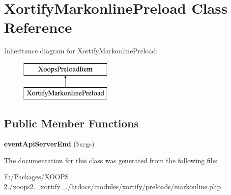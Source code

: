 \hypertarget{class_xortify_markonline_preload}{\section{Xortify\-Markonline\-Preload Class Reference}
\label{class_xortify_markonline_preload}
}
Inheritance diagram for Xortify\-Markonline\-Preload\-:\begin{figure}[H]
\begin{center}
\leavevmode
\includegraphics[height=2.000000cm]{class_xortify_markonline_preload}
\end{center}
\end{figure}
\subsection*{Public Member Functions}
\begin{DoxyCompactItemize}
\item 
\hypertarget{class_xortify_markonline_preload_a0ca031f78fab2485be7c0b8bf43a0f11}{{\bfseries event\-Api\-Server\-End} (\$args)}\label{class_xortify_markonline_preload_a0ca031f78fab2485be7c0b8bf43a0f11}

\end{DoxyCompactItemize}


The documentation for this class was generated from the following file\-:\begin{DoxyCompactItemize}
\item 
E\-:/\-Packages/\-X\-O\-O\-P\-S 2./xoops2.\-\_\-xortify\-\_./htdocs/modules/xortify/preloads/markonline.\-php\end{DoxyCompactItemize}
